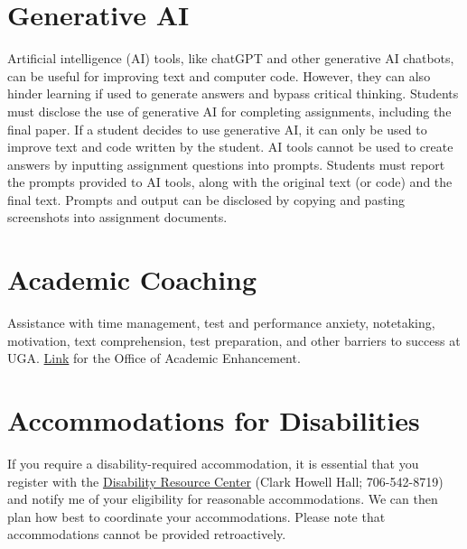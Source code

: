 \documentclass[12pt]{article}
\begin{document}
\section*{\normalsize Generative AI}
\vspace{-4mm}

Artificial intelligence (AI) tools, like chatGPT and other generative AI
chatbots, can be useful for improving text and computer code. However,
they can also hinder learning if used to generate answers and bypass
critical thinking. Students must disclose the use of generative AI for
completing assignments, including the final paper. If a
student decides to use generative AI, it can only be used to improve
text and code written by the student. AI tools cannot be used to create
answers by inputting assignment questions into prompts. Students
must report the prompts provided to AI tools, along with the original
text (or code) and the final text. Prompts and output can be disclosed
by copying and pasting screenshots into assignment documents. 



\section*{\normalsize Academic Coaching}
\vspace{-4mm}

Assistance with time management, test and performance anxiety,
notetaking, motivation, text comprehension, test preparation, and
other barriers to success at
UGA. \href{https://dae.uga.edu/services/academic-coaching/}{\color{blue}
  Link} for the Office of Academic Enhancement. 

\section*{\normalsize Accommodations for Disabilities}
\vspace{-4mm}

If you require a disability-required accommodation, it is essential
that you register with the \href{https://drc.uga.edu}{Disability Resource Center} (Clark Howell
Hall; 706-542-8719)
and notify me of your eligibility for reasonable accommodations. We
can then plan how best to coordinate your accommodations. Please note
that accommodations cannot be provided retroactively.
\end{document}
